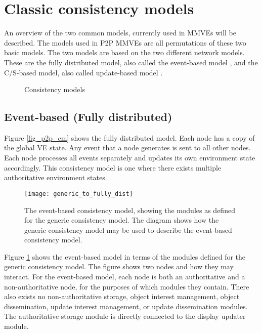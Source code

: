 \section{Classic consistency models}
\label{classic_models}

An overview of the two common models, currently used in MMVEs will be described. The models used in P2P MMVEs are all permutations of these two basic models. The two models are based on the two different network models. These are the fully distributed model, also called the event-based model \cite{p2p_cm_aoe}, and the C/S-based model, also called update-based model \cite{unreal_networking}.

\begin{figure}[htbp]
\centering {}
\caption{Consistency models}
\end{figure}

\subsection{Event-based (Fully distributed)}
\label{classic_event_based}


Figure \ref{fig_p2p_cm} shows the fully distributed model. Each node has a copy of the global VE state. Any event that a node generates is sent to all other nodes. Each node processes all events separately and updates its own environment state accordingly. This consistency model is one where there exists multiple authoritative environment states.

\begin{figure}[htbp]
 \centering
 \texttt{[image: generic\_to\_fully\_dist]}
 \caption{The event-based consistency model, showing the modules as defined for the generic consistency model. The diagram shows how the generic consistency model may be used to describe the event-based consistency model.}
 \label{fig_generic_to_fully_dist}
\end{figure}
%
Figure \ref{fig_generic_to_fully_dist} shows the event-based model in terms of the modules defined for the generic consistency model. The figure shows two nodes and how they may interact. For the event-based model, each node is both an authoritative and a non-authoritative node, for the purposes of which modules they contain. There also exists no non-authoritative storage, object interest management, object dissemination, update interest management, or update dissemination modules. The authoritative storage module is directly connected to the display updater module.

